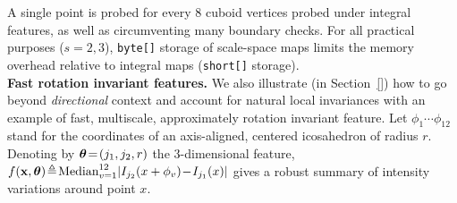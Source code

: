 A single point is probed for every $8$ cuboid vertices probed under integral features, as well as circumventing many boundary checks. For all practical purposes ($s=2,3$), \texttt{byte[]} storage of scale-space maps limits the memory 
overhead relative to integral maps (\texttt{short[]} storage).\\

\noindent
\textbf{Fast rotation invariant features.} We also illustrate (in Section~\ref{}) how to go beyond \textit{directional} context and account for natural local invariances with an example of fast, multiscale, approximately rotation invariant feature. Let $\phi_1\cdots\phi_{12}$ stand for the coordinates of an axis-aligned, centered icosahedron of radius $r$. Denoting by $\bm{\theta}\!=\!(j_1,j_2,r)$ the $3$-dimensional feature, $f(\boldsymbol{\mathrm{x}}, \bm{\theta})\!\triangleq\! \text{Median}_{v=1}^{12} \vert I_{j_2}(x+\phi_v)\!-\!I_{j_1}(x)\vert$ gives a robust summary of intensity variations around point $x$. %



